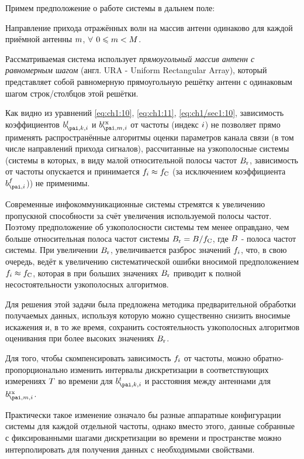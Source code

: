 Примем предположение о работе системы в дальнем поле:
\begin{assumption}
	\label{as:ch2/sec1:1}
	Направление прихода отражённых волн на массив антенн одинаково для каждой приёмной антенны ${m}$, $\forall$ $0\leqslant{m}<{M}$.
\end{assumption}

Рассматриваемая система использует \textit{прямоугольный массив антенн с равномерным шагом} (англ. URA - Uniform Rectangular Array), который представляет собой равномерную прямоугольную решётку антенн с одинаковым шагом строк/столбцов этой решётки.

Как видно из уравнений \eqref{eq:ch1:10}, \eqref{eq:ch1:11}, \eqref{eq:ch1/sec1:10}, зависимость коэффициентов $b_{\pai,\ti,\fri}^t$ и $b_{\pai,\rxi,\fri}^\te{rx}$ от частоты (индекс $i$) не позволяет прямо применять распространённые алгоритмы оценки параметров канала связи (в том числе направлений прихода сигналов), рассчитанные на узкополосные системы (системы в которых, в виду малой относительной полосы частот ${{B}_{\mathrm{r}}}$, зависимость от частоты опускается и принимается $f_i\approx f_{\mathrm{C}}$ (за исключением коэффициента $b_{\pai,\fri}^f$)) не применимы.

Современные инфокоммуникационные системы стремятся к увеличению пропускной способности за счёт увеличения используемой полосы частот. Поэтому предположение об узкополосности системы тем менее оправдано, чем больше относительная полоса частот системы ${{B}_{\mathrm{r}}}={B}/f_{\mathrm{C}}$, где ${B}$ - полоса частот системы. При увеличении ${{B}_{\mathrm{r}}}$, увеличивается разброс значений $f_i$, что, в свою очередь, ведёт к увеличению систематической ошибки вносимой предположением $f_i\approx f_{\mathrm{C}}$, которая в при больших значениях ${{B}_{\mathrm{r}}}$ приводит к полной несостоятельности узкополосных алгоритмов.

Для решения этой задачи была предложена методика предварительной обработки получаемых данных, используя которую можно существенно снизить вносимые искажения и, в то же время, сохранить состоятельность узкополосных алгоритмов оценивания при более высоких значениях ${{B}_{\mathrm{r}}}$. 

Для того, чтобы скомпенсировать зависимость $f_i$ от частоты, можно обратно-пропорционально изменить интервалы дискретизации в соответствующих измерениях $T$ во времени для $b_{\pai,\ti,\fri}^t$ и расстояния между антеннами для $b_{\pai,\rxi,\fri}^\te{rx}$. 

Практически такое изменение означало бы разные аппаратные конфигурации системы для каждой отдельной частоты, однако вместо этого, данные собранные с фиксированными шагами дискретизации во времени и пространстве можно интерполировать для получения данных с необходимыми свойствами.

